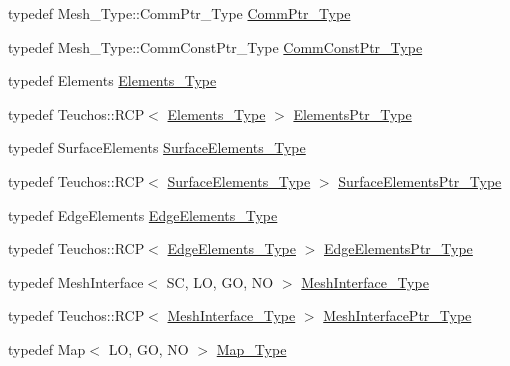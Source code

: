 \begin{DoxyCompactItemize}
\item 
typedef Mesh\+\_\+\+Type\+::\+Comm\+Ptr\+\_\+\+Type \hyperlink{classFEDD_1_1AdaptiveMeshRefinement_a28759ffaba5c0900ad9ad3b7b185d504}{Comm\+Ptr\+\_\+\+Type}
\item 
typedef Mesh\+\_\+\+Type\+::\+Comm\+Const\+Ptr\+\_\+\+Type \hyperlink{classFEDD_1_1AdaptiveMeshRefinement_a6bd5089532bd8dac39bebc4a92e33c40}{Comm\+Const\+Ptr\+\_\+\+Type}
\item 
typedef Elements \hyperlink{classFEDD_1_1AdaptiveMeshRefinement_ae08f7ca72876c1aba944120b3ca088d3}{Elements\+\_\+\+Type}
\item 
typedef Teuchos\+::\+R\+CP$<$ \hyperlink{classFEDD_1_1AdaptiveMeshRefinement_ae08f7ca72876c1aba944120b3ca088d3}{Elements\+\_\+\+Type} $>$ \hyperlink{classFEDD_1_1AdaptiveMeshRefinement_a9a08c5e3801ff9f9f3dff7997f9f4b1b}{Elements\+Ptr\+\_\+\+Type}
\item 
typedef Surface\+Elements \hyperlink{classFEDD_1_1AdaptiveMeshRefinement_afa6eaf74293132701460f9107ce0c070}{Surface\+Elements\+\_\+\+Type}
\item 
typedef Teuchos\+::\+R\+CP$<$ \hyperlink{classFEDD_1_1AdaptiveMeshRefinement_afa6eaf74293132701460f9107ce0c070}{Surface\+Elements\+\_\+\+Type} $>$ \hyperlink{classFEDD_1_1AdaptiveMeshRefinement_aabda3ef3658f8847265104c6cf9a3877}{Surface\+Elements\+Ptr\+\_\+\+Type}
\item 
typedef Edge\+Elements \hyperlink{classFEDD_1_1AdaptiveMeshRefinement_a891870bd161746dd633e1c8126d8fea1}{Edge\+Elements\+\_\+\+Type}
\item 
typedef Teuchos\+::\+R\+CP$<$ \hyperlink{classFEDD_1_1AdaptiveMeshRefinement_a891870bd161746dd633e1c8126d8fea1}{Edge\+Elements\+\_\+\+Type} $>$ \hyperlink{classFEDD_1_1AdaptiveMeshRefinement_a495f60e86da92289b7fe1c15e291660d}{Edge\+Elements\+Ptr\+\_\+\+Type}
\item 
typedef Mesh\+Interface$<$ SC, LO, GO, NO $>$ \hyperlink{classFEDD_1_1AdaptiveMeshRefinement_a2d24dca5502ca055019d31c569bf003e}{Mesh\+Interface\+\_\+\+Type}
\item 
typedef Teuchos\+::\+R\+CP$<$ \hyperlink{classFEDD_1_1AdaptiveMeshRefinement_a2d24dca5502ca055019d31c569bf003e}{Mesh\+Interface\+\_\+\+Type} $>$ \hyperlink{classFEDD_1_1AdaptiveMeshRefinement_a5d1f62bff0822daa8f0b7caf3e3b4311}{Mesh\+Interface\+Ptr\+\_\+\+Type}
\item 
typedef Map$<$ LO, GO, NO $>$ \hyperlink{classFEDD_1_1AdaptiveMeshRefinement_af60419a5ef8a4785991b704d1ad7aacb}{Map\+\_\+\+Type}
\item 

\end{DoxyCompactItemize}
